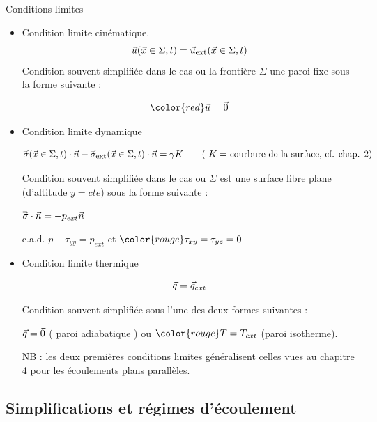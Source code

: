 \begin{frame}{Conditions limites}
\small

\begin{itemize}
\item Condition limite cinématique.
$$
\vec{u}(\vec{x} \in \Sigma, t) = \vec{u}_{\mbox{\footnotesize ext}}(\vec{x} \in \Sigma, t)
$$
Condition souvent simplifiée dans le cas ou la frontière $\Sigma$ une paroi fixe sous la forme suivante :

$$\color{red} \myvec{u} = \myvec{0}$$


\item Condition limite dynamique 

$$
\accentset{\Rightarrow}{\sigma}(\vec{x} \in \Sigma, t) \cdot \vec{n} 
	-
	\accentset{\Rightarrow}{\sigma}_{\mbox{\footnotesize ext}}(\vec{x} \in \Sigma, t)\cdot \vec{n}
= \gamma K \qquad \mbox{( $K = $ courbure de la surface, cf. chap. 2)}
$$


Condition souvent simplifiée dans le cas ou $\Sigma$ est une surface libre plane (d'altitude $y=cte$) sous la forme suivante :

$\accentset{\Rightarrow}{\sigma} \cdot \vec{n}  =-  p_{ext} \vec{n} $ 

c.a.d. { \color{rouge} $ p - \tau_{yy} = p_{ext}$}  et ${\color{rouge}  \tau_{xy} = \tau_{yz} = 0 }$

\item Condition limite thermique

$$ \vec{q} = \vec{q}_{ext} $$ 

Condition souvent simplifiée sous l'une des deux formes suivantes :

 { \color{rouge} $ \vec{q} = \vec{0} $}  ( paroi adiabatique ) ou ${\color{rouge}  T = T_{ext}}$ (paroi isotherme).

\pause
\medskip

NB : les deux premières conditions limites généralisent celles vues au chapitre 4 pour les écoulements plans parallèles.

\end{itemize}





\end{frame}


\subsection{Simplifications et régimes d'écoulement}

